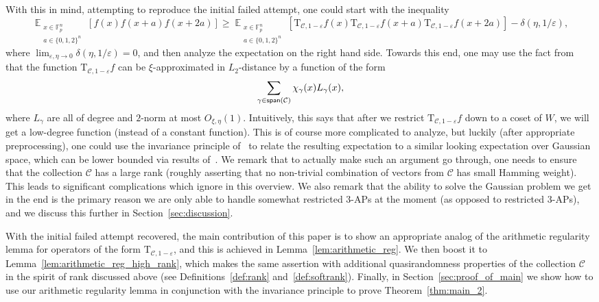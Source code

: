 \documentclass[11pt]{article}
\newcommand\Expect[2]{{\mathop{\mathbb{E}}_{#1}\left[ {#2} \right]}}
\newcommand\eps{\varepsilon}
\renewcommand\geq{\geqslant}
\begin{document}
With this in mind, attempting to reproduce the initial failed attempt, one could start with the inequality
\[
\Expect{\substack{x\in\mathbb{F}_p^n\\a\in\{0,1,2\}^n}}{f(x)f(x+a)f(x+2a)}
\geq 
\Expect{\substack{x\in\mathbb{F}_p^n\\a\in\{0,1,2\}^n}}{\mathrm{T}_{\mathcal{C},1-\eps}f(x)\mathrm{T}_{\mathcal{C},1-\eps}f(x+a)\mathrm{T}_{\mathcal{C},1-\eps}f(x+2a)}
-\delta(\eta,1/\eps),
\]
where $\lim_{\eps,\eta\rightarrow 0}\delta(\eta,1/\eps)=0$, and then analyze the expectation on the right hand side. Towards this end, one may use the fact from~\cite{BKM5} that the function $\mathrm{T}_{\mathcal{C},1-\eps}f$ can be $\xi$-approximated in $L_2$-distance by a function of the form
\[
\sum\limits_{\gamma\in{\sf span}(\mathcal{C})}\chi_{\gamma}(x) L_{\gamma}(x),
\]
where $L_{\gamma}$ are all of degree and $2$-norm at most $O_{\xi,\eta}(1)$. Intuitively, this says that after we restrict $\mathrm{T}_{\mathcal{C},1-\eps}f$ down to a coset of $W$, we will get a low-degree function (instead of a constant function). This is of course more complicated to analyze, but luckily (after appropriate preprocessing), one could use the invariance principle of~\cite{MOO} to relate the resulting expectation to a similar looking expectation over Gaussian space, which can be lower bounded via results of~\cite{ChenDafnisPaouris2015HolderGaussian}. We remark that to actually make such an argument go through, one needs to ensure that the collection $\mathcal{C}$ has a large rank (roughly asserting that no non-trivial combination of vectors from $\mathcal{C}$ has small Hamming weight). This leads to significant complications which ignore in this overview. We also remark that the ability to solve the Gaussian problem we get in the end is the primary reason we are only able to handle somewhat restricted $3$-APs at the moment (as opposed to restricted $3$-APs), and we discuss this further in Section~\ref{sec:discussion}.

With the initial failed attempt recovered, the main contribution of this paper is to show an appropriate analog of the arithmetic regularity lemma for operators of the form $\mathrm{T}_{\mathcal{C},1-\eps}$, and this is achieved in Lemma~\ref{lem:arithmetic_reg}. We then boost it to Lemma~\ref{lem:arithmetic_reg_high_rank}, which makes the same assertion with additional quasirandomness properties of the collection $\mathcal{C}$ in the spirit of rank discussed above (see Definitions~\ref{def:rank} and~\ref{def:softrank}). Finally, in Section~\ref{sec:proof_of_main} we show how to use our arithmetic regularity lemma in conjunction with the invariance principle to prove Theorem~\ref{thm:main_2}.
\end{document}
